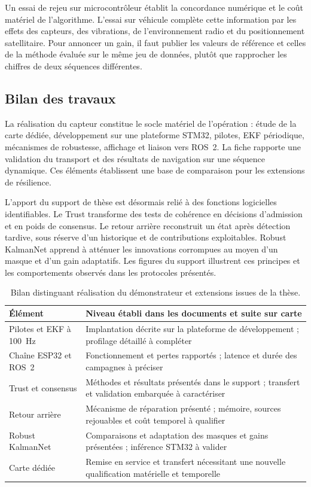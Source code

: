 \documentclass[11pt,a4paper]{article}
\begin{document}
Un essai de rejeu sur microcontrôleur établit la concordance numérique et le coût matériel de l'algorithme. L'essai sur véhicule complète cette information par les effets des capteurs, des vibrations, de l'environnement radio et du positionnement satellitaire. Pour annoncer un gain, il faut publier les valeurs de référence et celles de la méthode évaluée sur le même jeu de données, plutôt que rapprocher les chiffres de deux séquences différentes.
\FloatBarrier

\subsection{Bilan des travaux}

La réalisation du capteur constitue le socle matériel de l'opération : étude de la carte dédiée, développement sur une plateforme STM32, pilotes, EKF périodique, mécanismes de robustesse, affichage et liaison vers ROS~2. La fiche rapporte une validation du transport et des résultats de navigation sur une séquence dynamique. Ces éléments établissent une base de comparaison pour les extensions de résilience.

L'apport du support de thèse est désormais relié à des fonctions logicielles identifiables. Le Trust transforme des tests de cohérence en décisions d'admission et en poids de consensus. Le retour arrière reconstruit un état après détection tardive, sous réserve d'un historique et de contributions exploitables. Robust KalmanNet apprend à atténuer les innovations corrompues au moyen d'un masque et d'un gain adaptatifs. Les figures du support illustrent ces principes et les comportements observés dans les protocoles présentés.

\begin{table}[!htbp]\centering\small
\begin{tabularx}{\linewidth}{|L{4.4cm}|Y|}\hline
{}\textbf{Élément} & \textbf{Niveau établi dans les documents et suite sur carte}\\\hline
Pilotes et EKF à 100~Hz & Implantation décrite sur la plateforme de développement ; profilage détaillé à compléter\\\hline
Chaîne ESP32 et ROS~2 & Fonctionnement et pertes rapportés ; latence et durée des campagnes à préciser\\\hline
Trust et consensus & Méthodes et résultats présentés dans le support ; transfert et validation embarquée à caractériser\\\hline
Retour arrière & Mécanisme de réparation présenté ; mémoire, sources rejouables et coût temporel à qualifier\\\hline
Robust KalmanNet & Comparaisons et adaptation des masques et gains présentées ; inférence STM32 à valider\\\hline
Carte dédiée & Remise en service et transfert nécessitant une nouvelle qualification matérielle et temporelle\\\hline
\end{tabularx}
\caption{Bilan distinguant réalisation du démonstrateur et extensions issues de la thèse.}
\end{table}
\end{document}
